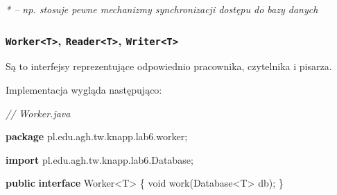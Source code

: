 \documentclass[11pt]{article}
\newenvironment{Shaded}{}{}
\newcommand{\KeywordTok}[1]{\textcolor[rgb]{0.00,0.44,0.13}{\textbf{{#1}}}}
\newcommand{\DataTypeTok}[1]{\textcolor[rgb]{0.56,0.13,0.00}{{#1}}}
\newcommand{\CommentTok}[1]{\textcolor[rgb]{0.38,0.63,0.69}{\textit{{#1}}}}
\newcommand{\FunctionTok}[1]{\textcolor[rgb]{0.02,0.16,0.49}{{#1}}}
\newcommand{\NormalTok}[1]{{#1}}
\newcommand{\ImportTok}[1]{{#1}}
\newcommand{\OperatorTok}[1]{\textcolor[rgb]{0.40,0.40,0.40}{{#1}}}
\begin{document}
\emph{* -- np. stosuje pewne mechanizmy synchronizacji dostępu do bazy
danych}

    \hypertarget{workert-readert-writert}{%
\subsubsection{\texorpdfstring{\texttt{Worker\textless{}T\textgreater{}},
\texttt{Reader\textless{}T\textgreater{}},
\texttt{Writer\textless{}T\textgreater{}}}{Worker\textless T\textgreater, Reader\textless T\textgreater, Writer\textless T\textgreater{}}}\label{workert-readert-writert}}

Są to interfejsy reprezentujące odpowiednio pracownika, czytelnika i
pisarza.

Implementacja wygląda następująco:

\begin{Shaded}
\begin{Highlighting}[]
\CommentTok{// Worker.java}

\KeywordTok{package}\ImportTok{ pl}\OperatorTok{.}\ImportTok{edu}\OperatorTok{.}\ImportTok{agh}\OperatorTok{.}\ImportTok{tw}\OperatorTok{.}\ImportTok{knapp}\OperatorTok{.}\ImportTok{lab6}\OperatorTok{.}\ImportTok{worker}\OperatorTok{;}

\KeywordTok{import} \ImportTok{pl}\OperatorTok{.}\ImportTok{edu}\OperatorTok{.}\ImportTok{agh}\OperatorTok{.}\ImportTok{tw}\OperatorTok{.}\ImportTok{knapp}\OperatorTok{.}\ImportTok{lab6}\OperatorTok{.}\ImportTok{Database}\OperatorTok{;}

\KeywordTok{public} \KeywordTok{interface}\NormalTok{ Worker}\OperatorTok{\textless{}}\NormalTok{T}\OperatorTok{\textgreater{}} \OperatorTok{\{}
    \DataTypeTok{void} \FunctionTok{work}\OperatorTok{(}\NormalTok{Database}\OperatorTok{\textless{}}\NormalTok{T}\OperatorTok{\textgreater{}}\NormalTok{ db}\OperatorTok{);}
\OperatorTok{\}}
\end{Highlighting}
\end{Shaded}
\end{document}
